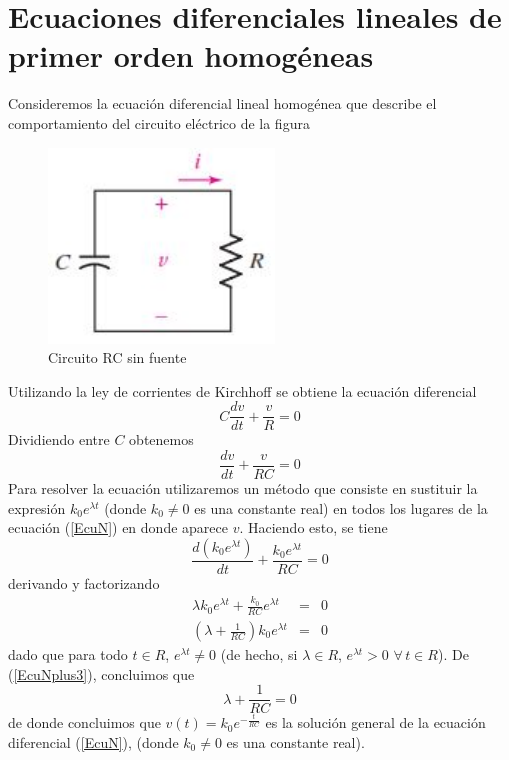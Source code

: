\documentclass{article}
\begin{document}
\section{Ecuaciones diferenciales lineales de primer orden homog\'{e}neas}
Consideremos la ecuaci\'{o}n diferencial lineal homog\'{e}nea que describe el comportamiento 
del circuito el\'{e}ctrico de la figura
\begin{figure}[h]
\begin{center}
\includegraphics[width=6cm]{./images/02_Circuito_RC.jpg}
\caption{
Circuito RC sin fuente
}
\end{center}
\end{figure}
Utilizando la ley de corrientes de Kirchhoff  se obtiene la ecuaci\'{o}n diferencial
\begin{equation}
 C\frac{dv}{dt}+\frac{v}{R}=0
\end{equation}
Dividiendo entre $C$ obtenemos
\begin{equation}
 \frac{dv}{dt}+\frac{v}{RC}=0
 \label{EcuN}
\end{equation}
Para resolver la ecuaci\'{o}n utilizaremos un m\'{e}todo que consiste en sustituir la expresi\'{o}n $k_{0}e^{\lambda t}$ (donde $k_{0}\neq 0$ es una constante real) en todos los lugares de la ecuaci\'{o}n (\ref{EcuN}) en donde aparece $v$. Haciendo esto, se tiene
\begin{equation}
 \frac{d(k_{0}e^{\lambda t})}{dt}+\frac{k_{0}e^{\lambda t}}{RC}=0
\end{equation}
derivando y factorizando
\begin{eqnarray}
 \lambda k_{0}e^{\lambda t}+\frac{k_{0}}{RC}e^{\lambda t}&=&0\\
 (\lambda + \frac{1}{RC})k_{0}e^{\lambda t}&=&0\label{EcuNplus3}
\end{eqnarray}
dado que para todo $t\in R$, $e^{\lambda t}\neq 0$ (de hecho, si $\lambda\in R$, $e^{\lambda t}>0$ $\forall\,t\in R$). De (\ref{EcuNplus3}), concluimos que
\begin{equation}
 \lambda + \frac{1}{RC}=0
\end{equation}
de donde concluimos que $v(t)=k_{0}e^{-\frac{t}{RC}}$ es la soluci\'{o}n general de la ecuaci\'{o}n diferencial (\ref{EcuN}), (donde $k_{0}\neq 0$ es una constante real).
\end{document}

